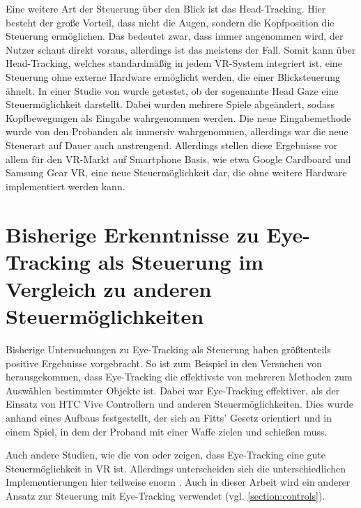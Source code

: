 Eine weitere Art der Steuerung über den Blick ist das Head-Tracking. Hier besteht der große Vorteil, dass nicht die Augen, sondern die Kopfposition die Steuerung ermöglichen. Das bedeutet zwar, dass immer angenommen wird, der Nutzer schaut direkt voraus, allerdings ist das meistens der Fall. Somit kann über Head-Tracking, welches standardmäßig in jedem \ac{VR}-System integriert ist, eine Steuerung ohne externe Hardware ermöglicht werden, die einer Blicksteuerung ähnelt. In einer Studie von \citeauthor{R.Atienza.2016} wurde getestet, ob der sogenannte \glqq Head Gaze\grqq{} eine Steuermöglichkeit darstellt. Dabei wurden mehrere Spiele abgeändert, sodass Kopfbewegungen als Eingabe wahrgenommen werden. Die neue Eingabemethode wurde von den Probanden als immersiv wahrgenommen, allerdings war die neue Steuerart auf Dauer auch anstrengend. Allerdings stellen diese Ergebnisse vor allem für den \ac{VR}-Markt auf Smartphone Basis, wie etwa Google Cardboard und Samsung Gear VR, eine neue Steuermöglichkeit dar, die ohne weitere Hardware implementiert werden kann. \cite{R.Atienza.2016}

\section{Bisherige Erkenntnisse zu Eye-Tracking als Steuerung im Vergleich zu anderen Steuermöglichkeiten}
Bisherige Untersuchungen zu Eye-Tracking als Steuerung haben größtenteils positive Ergebnisse vorgebracht. So ist zum Beispiel in den Versuchen von \citeauthor{Pai.2019} herausgekommen, dass Eye-Tracking die effektivste von mehreren Methoden zum Auswählen bestimmter Objekte ist. Dabei war Eye-Tracking effektiver, als der Einsatz von HTC Vive Controllern und anderen Steuermöglichkeiten. Dies wurde anhand eines Aufbaus festgestellt, der sich an Fitts' Gesetz orientiert und in einem Spiel, in dem der Proband mit einer Waffe zielen und schießen muss. \cite{Pai.2019}

Auch andere Studien, wie die von \citeauthor{D.Kumar.2016} oder \citeauthor{R.Atienza.2016} zeigen, dass Eye-Tracking eine gute Steuermöglichkeit in \ac{VR} ist. Allerdings unterscheiden sich die unterschiedlichen Implementierungen hier teilweise enorm \cite{Pai.2019} \cite{R.Atienza.2016} \cite{D.Kumar.2016}. Auch in dieser Arbeit wird ein anderer Ansatz zur Steuerung mit Eye-Tracking verwendet (vgl. \autoref{section:controls}).

